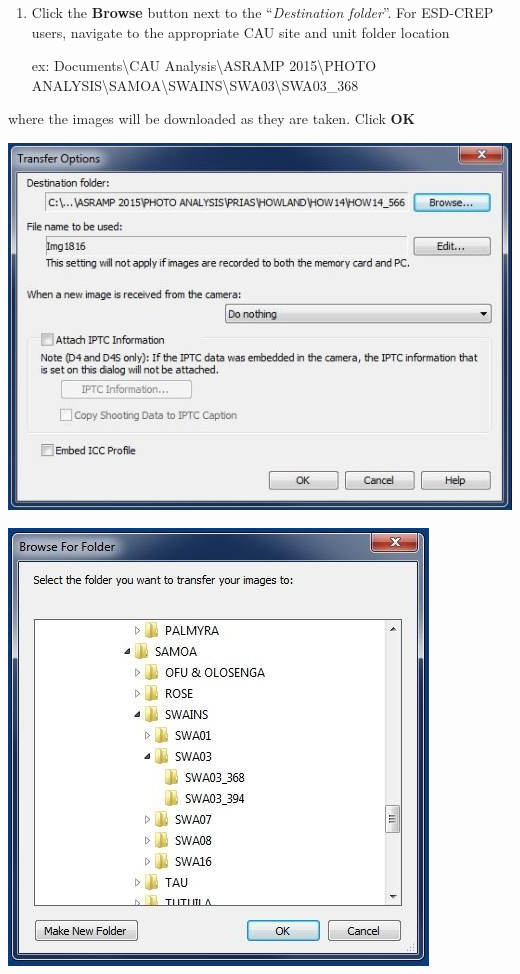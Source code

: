 \documentclass[]{book}
\begin{document}
\begin{enumerate}
\def\labelenumi{\arabic{enumi}.}
\setcounter{enumi}{7}
\item
  Click the \textbf{Browse} button next to the ``\emph{Destination folder}''. For ESD-CREP users, navigate to the appropriate CAU site and unit folder location

  ex: Documents\textbackslash CAU Analysis\textbackslash ASRAMP 2015\textbackslash PHOTO ANALYSIS\textbackslash SAMOA\textbackslash SWAINS\textbackslash SWA03\textbackslash SWA03\_368
\end{enumerate}

where the images will be downloaded as they are taken. Click \textbf{OK}

\includegraphics{images/Camera12.jpg}

\includegraphics{images/Camera13.jpg}
\end{document}

